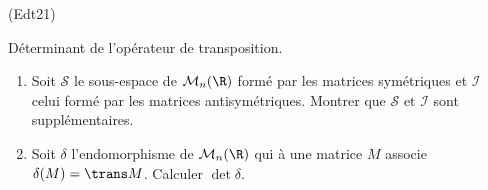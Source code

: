 \begin{tiny}(Edt21)\end{tiny} Déterminant de l'opérateur de transposition.
\begin{enumerate}
 \item Soit $\mathcal{S}$ le sous-espace de $\mathcal{M}_n(\R)$ formé par les matrices symétriques et $\mathcal{I}$ celui formé par les matrices antisymétriques. Montrer que $\mathcal{S}$ et $\mathcal{I}$ sont supplémentaires.
 \item Soit $\delta$ l'endomorphisme de $\mathcal{M}_n(\R)$ qui à une matrice $M$ associe $\delta(M)=\trans M$. Calculer $\det \delta$.
\end{enumerate}
